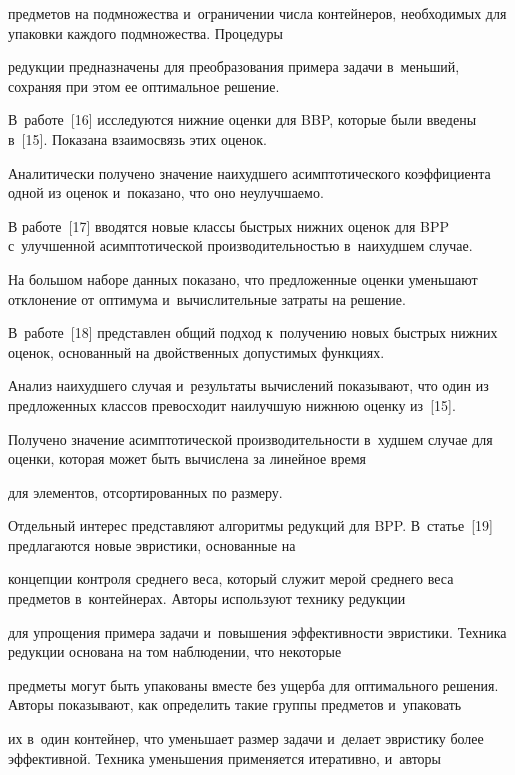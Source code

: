 предметов на подмножества и~ограничении чис\-ла контейнеров, необходимых для упаковки каж\-до\-го подмножества. Процедуры 

редукции пред\-на\-зна\-че\-ны для преобразования примера задачи в~меньший, со\-хра\-няя при этом ее оптимальное решение.

В~работе~[16] исследуются ниж\-ние оцен\-ки для BBP, которые были введены в~[15]. Показана вза\-и\-мо\-связь этих оценок. 

Аналитически получено значение наи\-худ\-ше\-го асимп\-то\-ти\-че\-ско\-го коэффициента одной из оценок и~показано, что оно не\-улуч\-ша\-емо.



В работе~[17] вводятся новые классы быст\-рых ниж\-них оценок для BPP с~улучшенной асимп\-то\-ти\-че\-ской про\-из\-во\-ди\-тель\-ностью в~наихудшем случае. 

На большом наборе данных показано, что предложенные оцен\-ки уменьшают отклонение от оптимума и~вы\-чис\-ли\-тель\-ные затраты на решение. 

В~работе~[18] пред\-став\-лен общий подход к~получению новых быст\-рых ниж\-них оценок, основанный на двойственных до\-пус\-ти\-мых функциях. 

Анализ наихудшего случая и~результаты вы\-чис\-ле\-ний показывают, что один из предложенных классов  превосходит наилучшую ниж\-нюю оценку из~[15]. 

Получено значение асимп\-то\-ти\-че\-ской про\-из\-во\-ди\-тель\-ности в~худшем случае для оценки, которая может быть вы\-чис\-ле\-на за линейное время 

для элементов, отсортированных по раз\-меру.





Отдельный интерес представляют алгоритмы редукций для BPP. В~статье~[19] предлагаются новые эвристики, основанные на 

концепции контроля сред\-не\-го веса, который служит мерой сред\-не\-го веса предметов в~контейнерах. Авторы используют технику редукции 

для упрощения примера задачи и~повышения эф\-фек\-тив\-ности эвристики. Техника редукции основана на том наблюдении, что некоторые 

предметы могут быть упакованы вмес\-те без ущерба для оптимального решения. Авторы показывают, как определить такие группы предметов и~упаковать 

их в~один контейнер, что уменьшает размер задачи и~делает эвристику более эффективной. Техника уменьшения применяется итеративно, и~авторы 

